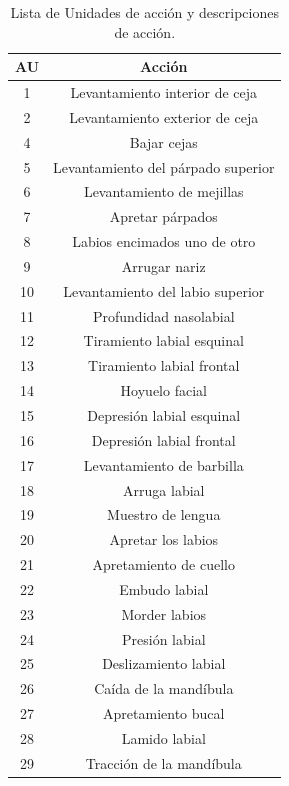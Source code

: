 \begin{table}[H]
\centering
\begin{tabular}{|c|c|}
\hline
\textbf{AU} & \textbf{Acción} \\ \hline
1             & Levantamiento interior de ceja      \\ \hline
2             & Levantamiento exterior de ceja      \\ \hline
4             & Bajar cejas                         \\ \hline
5             & Levantamiento del párpado superior  \\ \hline
6             & Levantamiento de mejillas           \\ \hline
7             & Apretar párpados                    \\ \hline
8             & Labios encimados uno de otro        \\ \hline
9             & Arrugar nariz                       \\ \hline
10            & Levantamiento del labio superior    \\ \hline
11            & Profundidad nasolabial              \\ \hline
12            & Tiramiento labial esquinal          \\ \hline
13            & Tiramiento labial frontal           \\ \hline
14            & Hoyuelo facial                      \\ \hline
15            & Depresión labial esquinal           \\ \hline
16            & Depresión labial frontal            \\ \hline
17            & Levantamiento de barbilla           \\ \hline
18            & Arruga labial                       \\ \hline
19            & Muestro de lengua                   \\ \hline
20            & Apretar los labios                  \\ \hline
21            & Apretamiento de cuello              \\ \hline
22            & Embudo labial                       \\ \hline
23            & Morder labios                       \\ \hline
24            & Presión labial                      \\ \hline
25            & Deslizamiento labial                \\ \hline
26            & Caída de la mandíbula               \\ \hline
27            & Apretamiento bucal                  \\ \hline
28            & Lamido labial                       \\ \hline
29            & Tracción de la mandíbula            \\ \hline
\end{tabular}
\caption{Lista de Unidades de acción y descripciones de acción.}
    \label{cuadro:AU}
\end{table}

